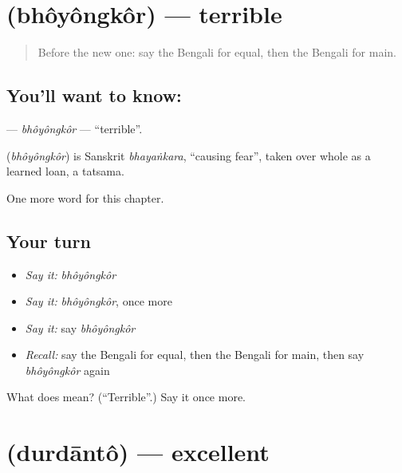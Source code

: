 \section[\texorpdfstring{\bn{ভয়ংকর} (bhôyôngkôr)}{ভয়ংকর (bhôyôngkôr)}]{ (bhôyôngkôr) — terrible}

\label{lesson:BN-C220-bhoyongkor}



\begin{quote}
Before the new one: say the Bengali for equal, then the Bengali for main.
\end{quote}

\subsection*{You'll want to know: }
\textbf{} — \emph{bhôyôngkôr} — \textquotedblleft{}terrible\textquotedblright{}.

\begin{cousinweb}
\textbf{} (\emph{bhôyôngkôr}) is Sanskrit \emph{bhayaṅkara}, \textquotedblleft{}causing fear\textquotedblright{}, taken over whole as a learned loan, a tatsama.
\end{cousinweb}

\begin{grammarlens}[title={What you've built}]
One more word for this chapter.
\end{grammarlens}

\subsection*{Your turn}
\begin{itemize}
\raggedright
  \item \emph{Say it:} \emph{bhôyôngkôr}
  \item \emph{Say it:} \emph{bhôyôngkôr}, once more
  \item \emph{Say it:} say \emph{bhôyôngkôr}
  \item \emph{Recall:} say the Bengali for equal, then the Bengali for main, then say \emph{bhôyôngkôr} again
\end{itemize}

\begin{tcolorbox}[breakable,colback=teal!4,colframe=teal!35!black,title={Before you move on}]
What does  mean? (\textquotedblleft{}Terrible\textquotedblright{}.) Say it once more.
\end{tcolorbox}
\section[\texorpdfstring{\bn{দুর্দান্ত} (durdāntô)}{দুর্দান্ত (durdāntô)}]{ (durdāntô) — excellent}

